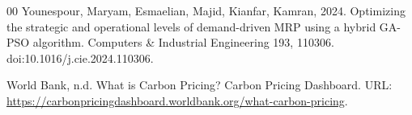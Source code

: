 \documentclass[preprint,12pt,authoryear]{elsarticle}
\begin{document}
\begin{thebibliography}{00}
Younespour, Maryam, Esmaelian, Majid, Kianfar, Kamran, 2024. Optimizing the strategic and
operational levels of demand-driven MRP using a hybrid GA-PSO algorithm. Computers
\& Industrial Engineering 193, 110306. doi:10.1016/j.cie.2024.110306.

World Bank, n.d. What is Carbon Pricing? Carbon Pricing Dashboard. URL:
\url{https://carbonpricingdashboard.worldbank.org/what-carbon-pricing}.

\end{thebibliography}
\end{document}
